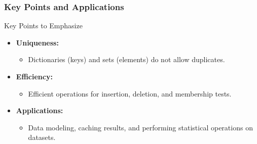 \documentclass{beamer}
\begin{document}
\begin{frame}[fragile]
    \frametitle{Key Points and Applications}
    \begin{block}{Key Points to Emphasize}
        \begin{itemize}
            \item \textbf{Uniqueness:} 
                \begin{itemize}
                    \item Dictionaries (keys) and sets (elements) do not allow duplicates. 
                \end{itemize}
            \item \textbf{Efficiency:}
                \begin{itemize}
                    \item Efficient operations for insertion, deletion, and membership tests.
                \end{itemize}
            \item \textbf{Applications:} 
                \begin{itemize}
                    \item Data modeling, caching results, and performing statistical operations on datasets.
                \end{itemize}
        \end{itemize}
    \end{block}
\end{frame}
\end{document}
